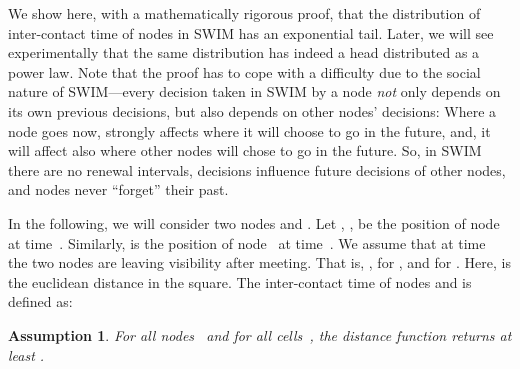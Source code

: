 \documentclass[conference]{IEEEtran}
\newtheorem{assumption}{Assumption}
\begin{document}
We show here, with a mathematically rigorous proof, that the distribution of
inter-contact time of nodes in SWIM has an exponential
tail. Later, we will see experimentally that the same distribution has indeed
a head distributed as a power law. Note that the proof has to cope with a
difficulty due to the social nature of SWIM---every decision taken in SWIM by a
node \emph{not} only depends on its own previous decisions, but also depends on
other nodes' decisions: Where a node goes now, strongly affects where it
will choose to go in the future, and, it will affect also where other
nodes will chose to go in the future. So, in SWIM there are no renewal
intervals, decisions influence future decisions of other nodes, and nodes never
``forget'' their past.

In the following, we will consider two nodes  and . Let , ,
be the position of node~ at time~. Similarly,  is the position of
node~ at time~. We assume that at time~ the two nodes are leaving
visibility after meeting. That is, ,  for
, and  for . Here,  is the
euclidean distance in the square. The inter-contact time of nodes  and 
is defined as:

\begin{assumption}
\label{ass:lower}
For all nodes~ and for all cells~, the distance function 
returns at least .
\end{assumption}
\end{document}
